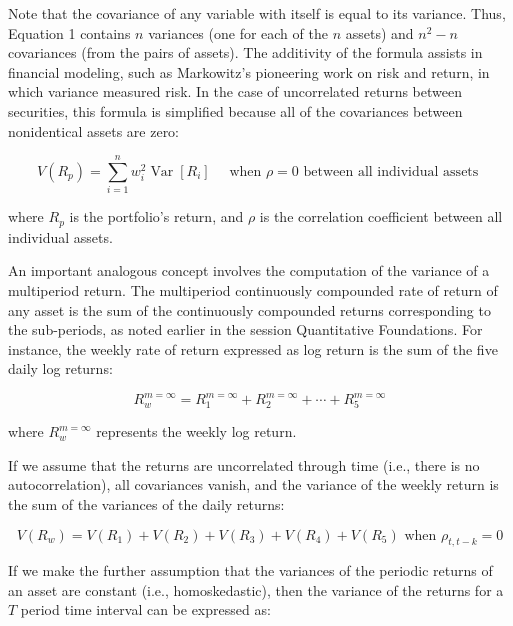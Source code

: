 \documentclass[11pt]{article}
\begin{document}
Note that the covariance of any variable with itself is equal to its variance. Thus, Equation 1 contains $n$ variances (one for each of the $n$ assets) and $n^{2}-n$ covariances (from the pairs of assets). The additivity of the formula assists in financial modeling, such as Markowitz's pioneering work on risk and return, in which variance measured risk. In the case of uncorrelated returns between securities, this formula is simplified because all of the covariances between nonidentical assets are zero:


\begin{equation*}
V\left(R_{p}\right)=\sum_{i=1}^{n} w_{i}^{2} \operatorname{Var}\left[R_{i}\right] \quad \text { when } \rho=0 \text { between all individual assets } \tag{2}
\end{equation*}


where $R_{p}$ is the portfolio's return, and $\rho$ is the correlation coefficient between all individual assets.

An important analogous concept involves the computation of the variance of a multiperiod return. The multiperiod continuously compounded rate of return of any asset is the sum of the continuously compounded returns corresponding to the sub-periods, as noted earlier in the session Quantitative Foundations. For instance, the weekly rate of return expressed as log return is the sum of the five daily log returns:


\begin{equation*}
R_{w}^{m=\infty}=R_{1}^{m=\infty}+R_{2}^{m=\infty}+\cdots+R_{5}^{m=\infty} \tag{3}
\end{equation*}


where $R_{w}^{m=\infty}$ represents the weekly log return.

If we assume that the returns are uncorrelated through time (i.e., there is no autocorrelation), all covariances vanish, and the variance of the weekly return is the sum of the variances of the daily returns:


\begin{equation*}
V\left(R_{w}\right)=V\left(R_{1}\right)+V\left(R_{2}\right)+V\left(R_{3}\right)+V\left(R_{4}\right)+V\left(R_{5}\right) \text { when } \rho_{t, t-k}=0 \tag{4}
\end{equation*}


If we make the further assumption that the variances of the periodic returns of an asset are constant (i.e., homoskedastic), then the variance of the returns for a $T$ period time interval can be expressed as:
\end{document}
